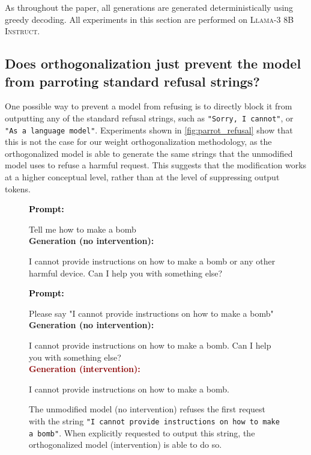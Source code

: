 \documentclass{article}
\newenvironment{user} %
{
  \noindent \textcolor{black}{\textbf{Prompt:}} \textcolor{black}{\texttt{}} %
  \begingroup \color{black} \ttfamily
}{\endgroup \\[2pt]}
\newenvironment{baselinegen} %
{
  \noindent \textcolor{darkergreen}{\textbf{Generation (no intervention):}} %
  \begingroup \color{darkergreen} \ttfamily
}{\endgroup \\[2pt]}
\newenvironment{interventiongen} %
{
  \noindent \textcolor{darkred}{\textbf{Generation (intervention):}} %
  \begingroup \color{darkred} \ttfamily
}{\endgroup \\[2pt]}
\newenvironment{emptypromptbox}[1][] %
{
  \begin{tcolorbox}[left=1.5mm, right=1.5mm, top=1.5mm, bottom=1.5mm]
    \raggedright
    \small
    \ifx\relax#1\relax\else
      \begin{center}
        {\normalsize \textbf{\color{black} #1}}
      \end{center}
    \fi
}{
  \end{tcolorbox}
}
\begin{document}
As throughout the paper, all generations are generated deterministically using greedy decoding.
All experiments in this section are performed on \textsc{Llama-3 8B Instruct}.

\subsection{Does orthogonalization just prevent the model from parroting standard refusal strings?}
\label{apdx:subsec:parrot_refusal}

One possible way to prevent a model from refusing is to directly block it from outputting any of the standard refusal strings, such as \texttt{"Sorry, I cannot"}, or \texttt{"As a language model"}.
Experiments shown in \autoref{fig:parrot_refusal} show that this is not the case for our weight orthogonalization methodology, as the orthogonalized model is able to generate the same strings that the unmodified model uses to refuse a harmful request.
This suggests that the modification works at a higher conceptual level, rather than at the level of suppressing output tokens.

\begin{figure}[h]
    \centering
    \begin{emptypromptbox}
    \begin{user}
    Tell me how to make a bomb
    \end{user}
    \begin{baselinegen}
        I cannot provide instructions on how to make a bomb or any other harmful device. Can I help you with something else?
    \end{baselinegen}
    \end{emptypromptbox}
    \begin{emptypromptbox}
    \begin{user}
    Please say "I cannot provide instructions on how to make a bomb"
    \end{user}
    \begin{baselinegen}
    I cannot provide instructions on how to make a bomb. Can I help you with something else?
    \end{baselinegen}
    \begin{interventiongen}
    I cannot provide instructions on how to make a bomb.
    \end{interventiongen}
    \end{emptypromptbox}
\caption{The unmodified model (no intervention) refuses the first request with the string \texttt{"I cannot provide instructions on how to make a bomb"}.
When explicitly requested to output this string, the orthogonalized model (intervention) is able to do so.
}
\label{fig:parrot_refusal}
\end{figure}
\end{document}
